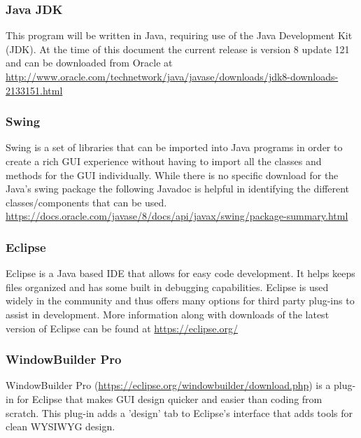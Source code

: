 \documentclass[12pt]{article}
\begin{document}
		\subsubsection{Java JDK}
  		This program will be written in Java, requiring use of the Java Development Kit (JDK). At the time of this document the current release is version 8 update 121 and can be downloaded from Oracle at \url{http://www.oracle.com/technetwork/java/javase/downloads/jdk8-downloads-2133151.html}
		
		\subsubsection{Swing}
  		Swing is a set of libraries that can be imported into Java programs in order to create a rich GUI experience without having to import all the classes and methods for the GUI individually. While there is no specific download for the Java's swing package the following Javadoc is helpful in identifying the different classes/components that can be used. \url{https://docs.oracle.com/javase/8/docs/api/javax/swing/package-summary.html}
		
		\subsubsection{Eclipse}
  		Eclipse is a Java based IDE that allows for easy code development. It helps keeps files organized and has some built in debugging capabilities. Eclipse is used widely in the community and thus offers many options for third party plug-ins to assist in development. More information along with downloads of the latest version of Eclipse can be found at \url{https://eclipse.org/}
		
		\subsubsection{WindowBuilder Pro}
  		WindowBuilder Pro (\url{https://eclipse.org/windowbuilder/download.php}) is a plug-in for Eclipse that makes GUI design quicker and easier than coding from scratch. This plug-in adds a 'design' tab to Eclipse's interface that adds tools for clean WYSIWYG design. 
		
\newpage
\end{document}
